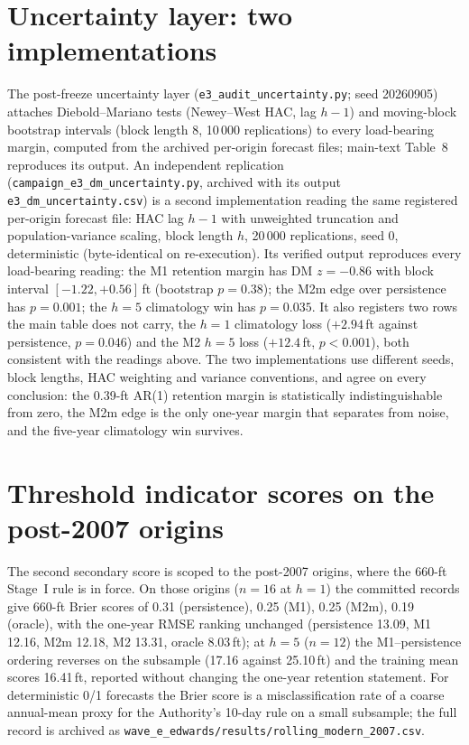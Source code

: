 \documentclass[preprint,11pt,authoryear]{elsarticle}
\theoremstyle{remark}
\begin{document}
\FloatBarrier
\section{Uncertainty layer: two implementations}\label{si:edwuncertainty}

The post-freeze uncertainty layer (\texttt{e3\_audit\_uncertainty.py}; seed 20260905) attaches Diebold--Mariano tests (Newey--West HAC, lag $h-1$) and moving-block bootstrap intervals (block length 8, 10\,000 replications) to every load-bearing margin, computed from the archived per-origin forecast files; main-text Table~8 reproduces its output. An independent replication (\texttt{campaign\_e3\_dm\_uncertainty.py}, archived with its output \texttt{e3\_dm\_uncertainty.csv}) is a second implementation reading the same registered per-origin forecast file: HAC lag $h-1$ with unweighted truncation and population-variance scaling, block length $h$, 20\,000 replications, seed 0, deterministic (byte-identical on re-execution). Its verified output reproduces every load-bearing reading: the M1 retention margin has DM $z=-0.86$ with block interval $[-1.22,+0.56]$\,ft (bootstrap $p=0.38$); the M2m edge over persistence has $p=0.001$; the $h=5$ climatology win has $p=0.035$. It also registers two rows the main table does not carry, the $h=1$ climatology loss ($+2.94$\,ft against persistence, $p=0.046$) and the M2 $h=5$ loss ($+12.4$\,ft, $p<0.001$), both consistent with the readings above. The two implementations use different seeds, block lengths, HAC weighting and variance conventions, and agree on every conclusion: the 0.39-ft AR(1) retention margin is statistically indistinguishable from zero, the M2m edge is the only one-year margin that separates from noise, and the five-year climatology win survives.

\section{Threshold indicator scores on the post-2007 origins}\label{si:edwbrier}

The second secondary score is scoped to the post-2007 origins, where the 660-ft Stage~I rule is in force. On those origins ($n=16$ at $h=1$) the committed records give 660-ft Brier scores of 0.31 (persistence), 0.25 (M1), 0.25 (M2m), 0.19 (oracle), with the one-year RMSE ranking unchanged (persistence 13.09, M1 12.16, M2m 12.18, M2 13.31, oracle 8.03\,ft); at $h=5$ ($n=12$) the M1--persistence ordering reverses on the subsample (17.16 against 25.10\,ft) and the training mean scores 16.41\,ft, reported without changing the one-year retention statement. For deterministic 0/1 forecasts the Brier score is a misclassification rate of a coarse annual-mean proxy for the Authority's 10-day rule on a small subsample; the full record is archived as \texttt{wave\_e\_edwards/results/rolling\_modern\_2007.csv}.
\end{document}
